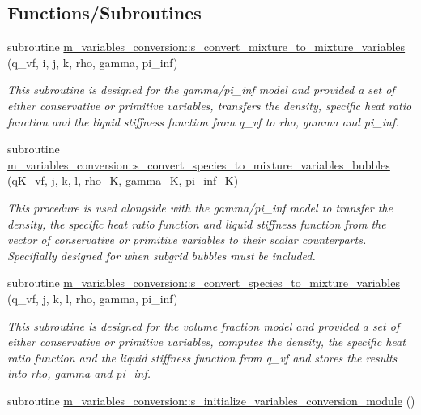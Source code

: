 \subsection*{Functions/\+Subroutines}
\begin{DoxyCompactItemize}
\item 
subroutine \hyperlink{namespacem__variables__conversion_ab76f1517a0d2503be8e1bfa7a8825485}{m\+\_\+variables\+\_\+conversion\+::s\+\_\+convert\+\_\+mixture\+\_\+to\+\_\+mixture\+\_\+variables} (q\+\_\+vf, i, j, k, rho, gamma, pi\+\_\+inf)
\begin{DoxyCompactList}\small\item\em This subroutine is designed for the gamma/pi\+\_\+inf model and provided a set of either conservative or primitive variables, transfers the density, specific heat ratio function and the liquid stiffness function from q\+\_\+vf to rho, gamma and pi\+\_\+inf. \end{DoxyCompactList}\item 
subroutine \hyperlink{namespacem__variables__conversion_ae67d5c9a515446d7258b13341c1bfb0a}{m\+\_\+variables\+\_\+conversion\+::s\+\_\+convert\+\_\+species\+\_\+to\+\_\+mixture\+\_\+variables\+\_\+bubbles} (q\+K\+\_\+vf, j, k, l, rho\+\_\+K, gamma\+\_\+K, pi\+\_\+inf\+\_\+K)
\begin{DoxyCompactList}\small\item\em This procedure is used alongside with the gamma/pi\+\_\+inf model to transfer the density, the specific heat ratio function and liquid stiffness function from the vector of conservative or primitive variables to their scalar counterparts. Specifially designed for when subgrid bubbles must be included. \end{DoxyCompactList}\item 
subroutine \hyperlink{namespacem__variables__conversion_add70754fa3c57535e4bc79c012962dc6}{m\+\_\+variables\+\_\+conversion\+::s\+\_\+convert\+\_\+species\+\_\+to\+\_\+mixture\+\_\+variables} (q\+\_\+vf, j, k, l, rho, gamma, pi\+\_\+inf)
\begin{DoxyCompactList}\small\item\em This subroutine is designed for the volume fraction model and provided a set of either conservative or primitive variables, computes the density, the specific heat ratio function and the liquid stiffness function from q\+\_\+vf and stores the results into rho, gamma and pi\+\_\+inf. \end{DoxyCompactList}\item 
subroutine \hyperlink{namespacem__variables__conversion_a3645e5a02bfdcb5d3a8f68f9c00cb051}{m\+\_\+variables\+\_\+conversion\+::s\+\_\+initialize\+\_\+variables\+\_\+conversion\+\_\+module} ()

\end{DoxyCompactItemize}
